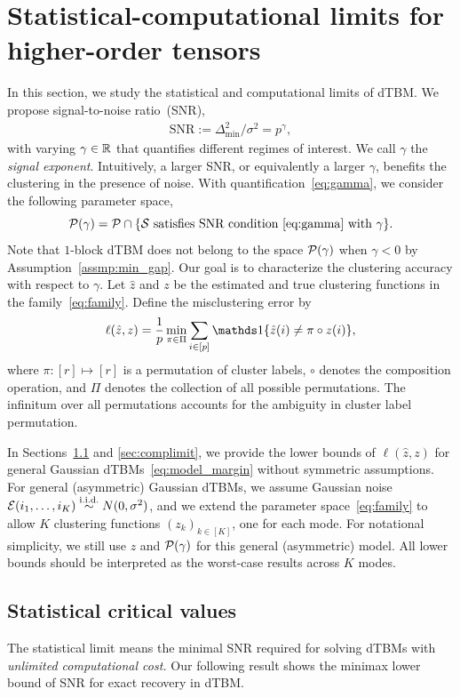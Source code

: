 \documentclass[lettersize,onecolumn,journal]{IEEEtran}
\theoremstyle{definition}
\theoremstyle{definition}
\begin{document}
\section{Statistical-computational limits for higher-order tensors}\label{sec:limits}

In this section, we study the statistical and computational limits of dTBM. We propose signal-to-noise ratio~(SNR),
\begin{align}\label{eq:gamma}
  \text{SNR}:= \Delta^2_{\min}/\sigma^2 = p^{\gamma}, 
\end{align}
with varying $\gamma \in \mathbb{R}$ that quantifies different regimes of interest. We call $\gamma$ the \emph{signal exponent}. Intuitively, a larger SNR, or equivalently a larger $\gamma$, benefits the clustering in the presence of noise. With quantification~\eqref{eq:gamma}, we consider the following parameter space,
\begin{equation}\label{eq:gammafamily}
    \tP(\gamma) = \tP\cap\{\tS \text{ satisfies SNR condition~\eqref{eq:gamma} with $\gamma$} \}.
\end{equation}
Note that $1$-block dTBM does not belong to the space $\mathcal{P}(\gamma)$ when $\gamma < 0$ by Assumption~\ref{assmp:min_gap}. Our goal is to characterize the clustering accuracy with respect to $\gamma$. Let $\hat z$ and $z$ be the estimated and true clustering functions in the family~\eqref{eq:family}. Define the misclustering error by
\[
\ell(\hat z, z)={1\over p}\min_{\pi \in \Pi}\sum_{i\in[p]}\ind\{\hat z(i)\neq \pi \circ z(i)\},
\]
where $\pi: [r] \mapsto [r]$ is a permutation of cluster labels, $\circ$ denotes the composition operation, and $\Pi$ denotes the collection of all possible permutations. The infinitum over all permutations accounts for the ambiguity in cluster label permutation. 

In Sections~\ref{sec:statlimit} and \ref{sec:complimit}, we provide the lower bounds of $\ell (\hat z, z)$ for general Gaussian dTBMs~\eqref{eq:model_margin} without symmetric assumptions. For general (asymmetric) Gaussian dTBMs, we assume Gaussian noise $\mathcal{E}(i_1,\ldots,i_K)\stackrel{\text{i.i.d.}}{\sim} N(0,\sigma^2)$, and we extend the parameter space~\eqref{eq:family} to allow $K$ clustering functions $(z_k)_{k\in[K]}$, one for each mode. For notational simplicity, we still use $z$ and $\mathcal{P}(\gamma)$ for this general (asymmetric) model. All lower bounds should be interpreted as the worst-case results across $K$ modes. 


\subsection{Statistical critical values}\label{sec:statlimit}
The statistical limit means the minimal SNR required for solving dTBMs with \emph{unlimited computational cost.} Our following result shows the minimax lower bound of SNR for exact recovery in dTBM. 
\end{document}
